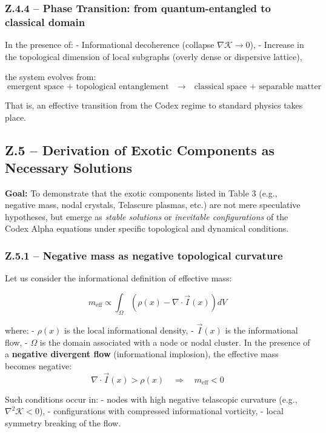 \documentclass[12pt]{article}
\begin{document}
\subsubsection*{Z.4.4 – Phase Transition: from quantum-entangled to classical domain}

In the presence of:
- Informational decoherence (collapse $\nabla \mathcal{K} \to 0$),
- Increase in the topological dimension of local subgraphs (overly dense or dispersive lattice),

the system evolves from:
\[
\text{emergent space + topological entanglement} \quad \to \quad \text{classical space + separable matter}
\]

That is, an effective transition from the Codex regime to standard physics takes place.

\subsection*{Z.5 – Derivation of Exotic Components as Necessary Solutions}

\textbf{Goal:} To demonstrate that the exotic components listed in Table 3 (e.g., negative mass, nodal crystals, Telascure plasmas, etc.) are not mere speculative hypotheses, but emerge as \emph{stable solutions} or \emph{inevitable configurations} of the Codex Alpha equations under specific topological and dynamical conditions.

\subsubsection*{Z.5.1 – Negative mass as negative topological curvature}

Let us consider the informational definition of effective mass:

\[
m_{\text{eff}} \propto \int_{\Omega} \left( \rho(x) - \nabla \cdot \vec{I}(x) \right) dV
\]

where:
- $\rho(x)$ is the local informational density,
- $\vec{I}(x)$ is the informational flow,
- $\Omega$ is the domain associated with a node or nodal cluster.
In the presence of a \textbf{negative divergent flow} (informational implosion), the effective mass becomes negative:
\[
\nabla \cdot \vec{I}(x) > \rho(x) \quad \Rightarrow \quad m_{\text{eff}} < 0
\]

Such conditions occur in:
- nodes with high negative telascopic curvature (e.g., $\nabla^2 \mathcal{K} < 0$),
- configurations with compressed informational vorticity,
- local symmetry breaking of the flow.
\end{document}
